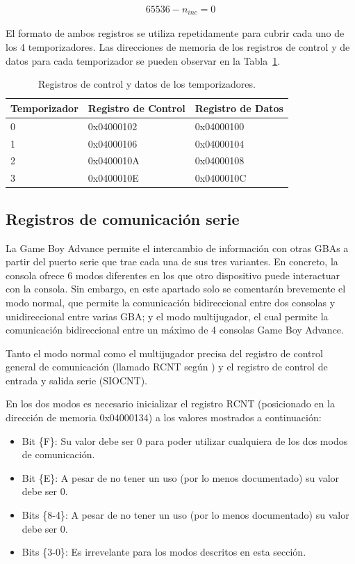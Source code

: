 {\begin{align}
	65536 - n_{inc} = 0
	\label{eq:eq_temporizador}
\end{align}

El formato de ambos registros se utiliza repetidamente para cubrir cada uno de los 4 temporizadores. Las direcciones de memoria de los registros de control y de datos para cada temporizador se pueden observar en la Tabla~\ref{tab:temporizadores}.

\begin{table}[h]
	\centering
	\begin{tabular}{| l | l | l |}
		\hline
		\textbf{Temporizador} & \textbf{Registro de Control} & \textbf{Registro de Datos}  \\ \hline
		0 &  0x04000102 & 0x04000100  \\ \hline
		1 &  0x04000106 & 0x04000104  \\ \hline
		2 &  0x0400010A & 0x04000108  \\ \hline
		3 &  0x0400010E & 0x0400010C  \\ \hline
	\end{tabular}
	\caption{Registros de control y datos de los temporizadores.}\label{tab:temporizadores}
\end{table}
\FloatBarrier{}

\subsection{Registros de comunicación serie}
La Game Boy Advance permite el intercambio de información con otras GBAs a partir del puerto serie que trae cada una de sus tres variantes. En concreto, la consola ofrece 6 modos diferentes en los que otro dispositivo puede interactuar con la consola. Sin embargo, en este apartado solo se comentarán brevemente el modo normal, que permite la comunicación bidireccional entre dos consolas y unidireccional entre varias GBA; y el modo multijugador, el cual permite la comunicación bidireccional entre un máximo de 4 consolas Game Boy Advance.

Tanto el modo normal como el multijugador precisa del registro de control general de comunicación (llamado RCNT según \cite{bib:gbatek}) y el registro de control de entrada y salida serie (SIOCNT).

En los dos modos es necesario inicializar el registro RCNT (posicionado en la dirección de memoria 0x04000134) a los valores mostrados a continuación:

\begin{itemize}
	\item Bit \{F\}: Su valor debe ser 0 para poder utilizar cualquiera de los dos modos de comunicación.
	\item Bit \{E\}: A pesar de no tener un uso (por lo menos documentado) su valor debe ser 0.
	\item Bits \{8-4\}: A pesar de no tener un uso (por lo menos documentado) su valor debe ser 0.
	\item Bits \{3-0\}: Es irrevelante para los modos descritos en esta sección.
\end{itemize}

}
